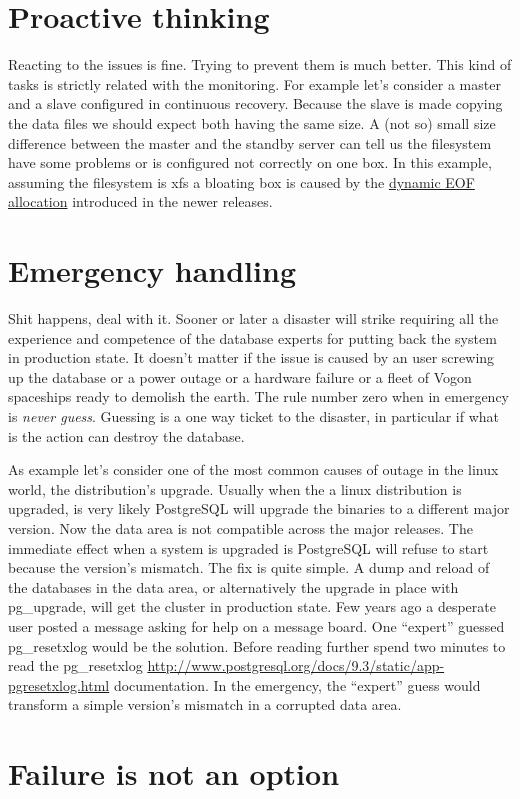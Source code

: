 \section{Proactive thinking}
Reacting to the issues is fine. Trying to prevent them is much better. This kind of tasks is strictly 
related with the monitoring. For example let's consider a master and a slave configured in continuous 
recovery. Because the slave is made copying the data files we should expect both having the same size. 
A (not so) small size difference between the master and the standby server can tell us the filesystem have 
some problems or is configured not correctly on one box. In this example, assuming the filesystem is xfs a 
bloating box is caused by the 
\href{
http://serverfault.com/questions/406069/why-are-my-xfs-filesystems-suddenly-consuming-more-space-and-full-of
-sparse-file}{dynamic EOF allocation} introduced in the newer releases.

\section{Emergency handling}
Shit happens, deal with it. Sooner or later a disaster will strike requiring all the experience and 
competence of the database experts for putting back the system in production state. It doesn't matter if the 
issue is caused by an user screwing up the database or a power outage or a hardware failure or a fleet of 
Vogon spaceships ready to demolish the earth. The rule number zero when in emergency is \textit{never 
guess}. Guessing is a one way ticket to the disaster, in particular if what is the action 
can destroy the database.\newline

As example let's consider one of the most common causes of outage in the linux world, the distribution's 
upgrade. Usually when the a linux distribution is upgraded, is very likely PostgreSQL will upgrade the 
binaries to a different major version. Now the data area is not compatible across the major releases. The 
immediate effect when a system is upgraded is PostgreSQL will refuse to start because the version's 
mismatch. The fix is quite simple. A dump and reload of the databases in the data area, or alternatively 
the upgrade in place with pg\_upgrade, will get the cluster in production state. Few years ago a 
desperate user posted a message asking for help on a message board. One ``expert'' guessed 
pg\_resetxlog would be the solution. Before reading further spend two minutes to  read the 
pg\_resetxlog 
\href{http://www.postgresql.org/docs/9.3/static/app-pgresetxlog.html}{
http://www.postgresql.org/docs/9.3/static/app-pgresetxlog.html} documentation. In the emergency, the 
``expert'' guess would transform a simple version's mismatch in a corrupted data area.


\section{Failure is not an option}